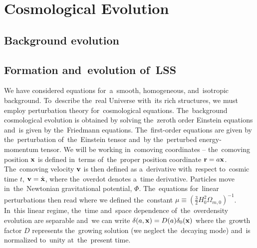 \chapter{Cosmological Evolution}
\label{chpt:cosmo_evol}
\section{Background evolution}


% 

% 
\section{Formation and~evolution of~LSS}
We have considered equations for~a~smooth, homogeneous, and~isotropic background. To~describe the~real Universe with~its rich structures, we must employ perturbation theory for~cosmological equations. The~background cosmological evolution is obtained by solving the~zeroth order Einstein equations and~is given by the~Friedmann equations. The~first-order equations are given by the~perturbation of~the~Einstein tensor and~by the~perturbed energy-momentum tensor. We will be working in~comoving coordinates -- the~comoving position $\mathbf x$ is defined in~terms of~the~proper position coordinate $\mathbf r = a\mathbf x$. The~comoving velocity $\mathbf v$ is then defined as a~derivative with~respect to~cosmic time $t$, $\mathbf v = \dot{\mathbf x}$, where the~overdot denotes a~time derivative. Particles move in~the~Newtonian gravitational potential, $\Phi$. The~equations for~linear perturbations then read
where we defined the~constant $\mu\equiv\left(\frac32 H_0^2\Omega_{m, 0}\right)^{-1}$. In~this linear regime, the~time and~space dependence of~the~overdensity evolution are separable and~we can write $\delta(a, \mathbf x)=D(a)\delta_0(\mathbf x)$ where the~growth factor $D$ represents the~growing solution (we neglect the~decaying mode) and~is normalized to~unity at~the~present time.

